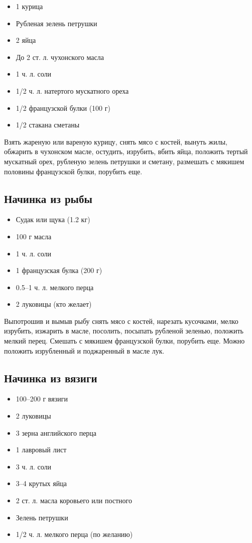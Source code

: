 \begin{itemize}
	\item 1 курица
    \item Рубленая зелень петрушки 
    \item 2 яйца
    \item До 2 ст. л. чухонского масла
    \item 1 ч. л. соли
    \item 1/2 ч. л. натертого мускатного ореха 
    \item 1/2 французской булки (100 г) 
    \item 1/2 стакана сметаны
\end{itemize}

Взять жареную или вареную курицу, снять мясо с костей, вынуть жилы, обжарить в чухонском масле, остудить, изрубить, вбить яйца, положить тертый мускатный орех, рубленую зелень петрушки и сметану, размешать с мякишем половины французской булки, порубить еще.

\subsection{Начинка из рыбы}\label{6nachinka-ryba}

\begin{itemize}
	\item Судак или щука (1.2 кг) 
    \item 100 г масла 
    \item 1 ч. л. соли 
    \item 1 французская булка (200 г)
    \item 0.5–1 ч. л. мелкого перца 
    \item 2 луковицы (кто желает)
\end{itemize}

Выпотрошив и вымыв рыбу снять мясо с костей, нарезать кусочками, мелко изрубить, изжарить в масле, посолить, посыпать рубленой зеленью, положить мелкий перец. Смешать с мякишем французской булки, порубить еще. Можно положить изрубленный и поджаренный в масле лук.

\subsection{Начинка из вязиги}

\begin{itemize}
	\item 100–200 г вязиги 
    \item 2 луковицы 
    \item 3 зерна английского перца 
    \item 1 лавровый лист
    \item 3 ч. л. соли
    \item 3–4 крутых яйца 
    \item 2 ст. л. масла коровьего или постного 
    \item Зелень петрушки 
    \item 1/2 ч. л. мелкого перца (по желанию)
\end{itemize}

